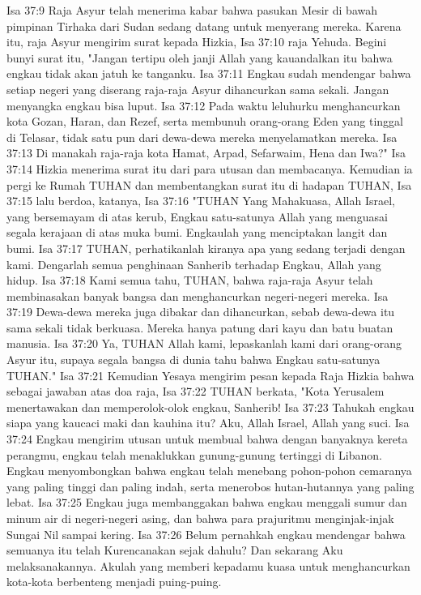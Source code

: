 Isa 37:9  Raja Asyur telah menerima kabar bahwa pasukan Mesir di bawah pimpinan Tirhaka dari Sudan sedang datang untuk menyerang mereka. Karena itu, raja Asyur mengirim surat kepada Hizkia,
Isa 37:10  raja Yehuda. Begini bunyi surat itu, "Jangan tertipu oleh janji Allah yang kauandalkan itu bahwa engkau tidak akan jatuh ke tanganku.
Isa 37:11  Engkau sudah mendengar bahwa setiap negeri yang diserang raja-raja Asyur dihancurkan sama sekali. Jangan menyangka engkau bisa luput.
Isa 37:12  Pada waktu leluhurku menghancurkan kota Gozan, Haran, dan Rezef, serta membunuh orang-orang Eden yang tinggal di Telasar, tidak satu pun dari dewa-dewa mereka menyelamatkan mereka.
Isa 37:13  Di manakah raja-raja kota Hamat, Arpad, Sefarwaim, Hena dan Iwa?"
Isa 37:14  Hizkia menerima surat itu dari para utusan dan membacanya. Kemudian ia pergi ke Rumah TUHAN dan membentangkan surat itu di hadapan TUHAN,
Isa 37:15  lalu berdoa, katanya,
Isa 37:16  "TUHAN Yang Mahakuasa, Allah Israel, yang bersemayam di atas kerub, Engkau satu-satunya Allah yang menguasai segala kerajaan di atas muka bumi. Engkaulah yang menciptakan langit dan bumi.
Isa 37:17  TUHAN, perhatikanlah kiranya apa yang sedang terjadi dengan kami. Dengarlah semua penghinaan Sanherib terhadap Engkau, Allah yang hidup.
Isa 37:18  Kami semua tahu, TUHAN, bahwa raja-raja Asyur telah membinasakan banyak bangsa dan menghancurkan negeri-negeri mereka.
Isa 37:19  Dewa-dewa mereka juga dibakar dan dihancurkan, sebab dewa-dewa itu sama sekali tidak berkuasa. Mereka hanya patung dari kayu dan batu buatan manusia.
Isa 37:20  Ya, TUHAN Allah kami, lepaskanlah kami dari orang-orang Asyur itu, supaya segala bangsa di dunia tahu bahwa Engkau satu-satunya TUHAN."
Isa 37:21  Kemudian Yesaya mengirim pesan kepada Raja Hizkia bahwa sebagai jawaban atas doa raja,
Isa 37:22  TUHAN berkata, "Kota Yerusalem menertawakan dan memperolok-olok engkau, Sanherib!
Isa 37:23  Tahukah engkau siapa yang kaucaci maki dan kauhina itu? Aku, Allah Israel, Allah yang suci.
Isa 37:24  Engkau mengirim utusan untuk membual bahwa dengan banyaknya kereta perangmu, engkau telah menaklukkan gunung-gunung tertinggi di Libanon. Engkau menyombongkan bahwa engkau telah menebang pohon-pohon cemaranya yang paling tinggi dan paling indah, serta menerobos hutan-hutannya yang paling lebat.
Isa 37:25  Engkau juga membanggakan bahwa engkau menggali sumur dan minum air di negeri-negeri asing, dan bahwa para prajuritmu menginjak-injak Sungai Nil sampai kering.
Isa 37:26  Belum pernahkah engkau mendengar bahwa semuanya itu telah Kurencanakan sejak dahulu? Dan sekarang Aku melaksanakannya. Akulah yang memberi kepadamu kuasa untuk menghancurkan kota-kota berbenteng menjadi puing-puing.
